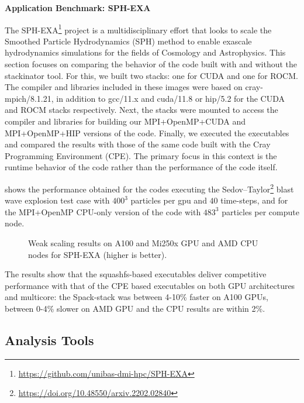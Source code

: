 \noindent\textbf{Application Benchmark: SPH-EXA}

The SPH-EXA\footnote{\url{https://github.com/unibas-dmi-hpc/SPH-EXA}} project is a multidisciplinary effort that looks to scale the Smoothed Particle Hydrodynamics (SPH) method to enable exascale hydrodynamics simulations for the fields of Cosmology and Astrophysics. 
This section focuses on comparing the behavior of the code built with and without the stackinator tool.
For this, we built two \stackinator stacks: one for CUDA and one for ROCM.
The compiler and libraries included in these images were based on cray-mpich/8.1.21, in addition to gcc/11.x and cuda/11.8 or hip/5.2 for the CUDA and ROCM stacks respectively.
Next, the stacks were mounted to access the compiler and libraries for building our MPI+OpenMP+CUDA and MPI+OpenMP+HIP versions of the code.
Finally, we executed the executables and compared the results with those of the same code built with the Cray Programming Environment (CPE).
The primary focus in this context is the runtime behavior of the code rather than the performance of the code itself.

 shows the performance obtained for the codes executing the Sedov--Taylor\footnote{\url{https://doi.org/10.48550/arxiv.2202.02840}} blast wave explosion test case with $400^3$ particles per gpu and $40$ time-steps, and for the MPI+OpenMP CPU-only version of the code with $483^3$ particles per compute node.

\begin{figure}[htp!]
    \begin{center}
        
        
        
    \end{center}
    \caption{Weak scaling results on A100 and Mi250x GPU and AMD CPU nodes for SPH-EXA (higher is better).}
    \label{fig:sph-weak}
\end{figure}

The results show that the squashfs-based executables deliver competitive performance with that of the CPE based executables on both GPU architectures and multicore: the Spack-stack was between 4-10\% faster on A100 GPUs, between 0-4\% slower on AMD GPU and the CPU results are within 2\%.

\subsection{Analysis Tools}

